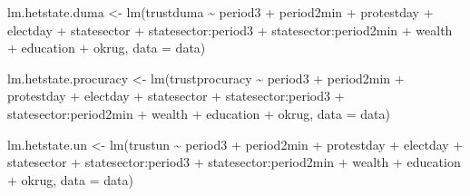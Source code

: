 \documentclass[
  letterpaper,
  DIV=11,
  numbers=noendperiod]{scrartcl}
\newenvironment{Shaded}{\begin{snugshade}}{\end{snugshade}}
\newcommand{\AttributeTok}[1]{\textcolor[rgb]{0.40,0.45,0.13}{#1}}
\newcommand{\FunctionTok}[1]{\textcolor[rgb]{0.28,0.35,0.67}{#1}}
\newcommand{\NormalTok}[1]{\textcolor[rgb]{0.00,0.23,0.31}{#1}}
\newcommand{\OtherTok}[1]{\textcolor[rgb]{0.00,0.23,0.31}{#1}}
\newcommand{\SpecialCharTok}[1]{\textcolor[rgb]{0.37,0.37,0.37}{#1}}
\begin{document}
\begin{Shaded}
\begin{Highlighting}[]
\NormalTok{lm.hetstate.duma }\OtherTok{\textless{}{-}} \FunctionTok{lm}\NormalTok{(trustduma }\SpecialCharTok{\textasciitilde{}}\NormalTok{ period3 }\SpecialCharTok{+}\NormalTok{ period2min }\SpecialCharTok{+}\NormalTok{ protestday }\SpecialCharTok{+}\NormalTok{ electday }\SpecialCharTok{+}
\NormalTok{                         statesector }\SpecialCharTok{+}\NormalTok{ statesector}\SpecialCharTok{:}\NormalTok{period3 }\SpecialCharTok{+}\NormalTok{ statesector}\SpecialCharTok{:}\NormalTok{period2min }\SpecialCharTok{+}
\NormalTok{                         wealth }\SpecialCharTok{+}\NormalTok{ education }\SpecialCharTok{+}\NormalTok{ okrug, }\AttributeTok{data =}\NormalTok{ data)}

\NormalTok{lm.hetstate.procuracy }\OtherTok{\textless{}{-}} \FunctionTok{lm}\NormalTok{(trustprocuracy }\SpecialCharTok{\textasciitilde{}}\NormalTok{ period3 }\SpecialCharTok{+}\NormalTok{ period2min }\SpecialCharTok{+}\NormalTok{ protestday }\SpecialCharTok{+}\NormalTok{ electday }\SpecialCharTok{+}
\NormalTok{                              statesector }\SpecialCharTok{+}\NormalTok{ statesector}\SpecialCharTok{:}\NormalTok{period3 }\SpecialCharTok{+}\NormalTok{ statesector}\SpecialCharTok{:}\NormalTok{period2min }\SpecialCharTok{+}
\NormalTok{                              wealth }\SpecialCharTok{+}\NormalTok{ education }\SpecialCharTok{+}\NormalTok{ okrug, }\AttributeTok{data =}\NormalTok{ data)}

\NormalTok{lm.hetstate.un }\OtherTok{\textless{}{-}} \FunctionTok{lm}\NormalTok{(trustun }\SpecialCharTok{\textasciitilde{}}\NormalTok{ period3 }\SpecialCharTok{+}\NormalTok{ period2min }\SpecialCharTok{+}\NormalTok{ protestday }\SpecialCharTok{+}\NormalTok{ electday }\SpecialCharTok{+}
\NormalTok{                       statesector }\SpecialCharTok{+}\NormalTok{ statesector}\SpecialCharTok{:}\NormalTok{period3 }\SpecialCharTok{+}\NormalTok{ statesector}\SpecialCharTok{:}\NormalTok{period2min }\SpecialCharTok{+}
\NormalTok{                       wealth }\SpecialCharTok{+}\NormalTok{ education }\SpecialCharTok{+}\NormalTok{ okrug, }\AttributeTok{data =}\NormalTok{ data)}


\end{Highlighting}
\end{Shaded}
\end{document}
